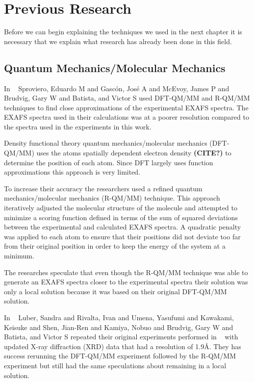 \chapter{Previous Research}

Before we can begin explaining the techniques we used in the next chapter it is necessary that we explain what research has already been done in this field.

\section{Quantum Mechanics/Molecular Mechanics}

In ~\cite{sproviero2008model} Sproviero, Eduardo M and Gasc{\'o}n, Jos{\'e} A and McEvoy, James P and Brudvig, Gary W and Batista, and Victor S used DFT-QM/MM and R-QM/MM techniques to find close approximations of the experimental EXAFS spectra. The EXAFS spectra used in their calculations was at a poorer resolution compared to the spectra used in the experiments in this work.

Density functional theory quantum mechanics/molecular mechanics (DFT-QM/MM) uses the atoms spatially dependent electron density \textbf{(CITE?)} to determine the position of each atom. Since DFT largely uses function approximations this approach is very limited.

To increase their accuracy the researchers used a refined quantum mechanics/molecular mechanics (R-QM/MM) technique. This approach iteratively adjusted the molecular structure of the molecule and attempted to minimize a scoring function defined in terms of the sum of squared deviations between the experimental and calculated EXAFS spectra. A quadratic penalty was applied to each atom to ensure that their positions did not deviate too far from their original position in order to keep the energy of the system at a minimum.

The researches speculate that even though the R-QM/MM technique was able to generate an EXAFS spectra closer to the experimental spectra their solution was only a local solution because it was based on their original DFT-QM/MM solution.

In ~\cite{luber2011s1} Luber, Sandra and Rivalta, Ivan and Umena, Yasufumi and Kawakami, Keisuke and Shen, Jian-Ren and Kamiya, Nobuo and Brudvig, Gary W and Batista, and Victor S repeated their original experiments performed in ~\cite{sproviero2008model} with updated X-ray diffraction (XRD) data that had a resolution of 1.9\AA. They has success rerunning the DFT-QM/MM experiment followed by the R-QM/MM experiment but still had the same speculations about remaining in a local solution.
